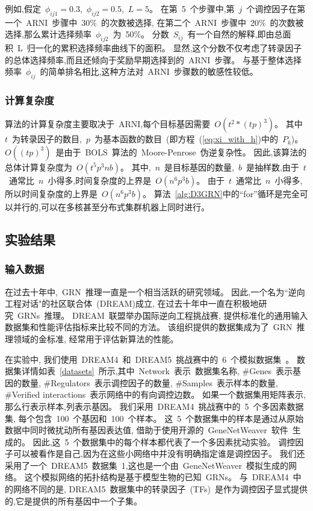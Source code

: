 例如,假定~$\phi_{ij1}=0.3$,~$\phi_{ij2}=0.5$,~$L=5$。
在第~5~个步骤中,第~$j$~个调控因子在第一个~ARNI~步骤中~30\%~的次数被选择,
在第二个~ARNI~步骤中~20\%~的次数被选择,那么累计选择频率~$\phi_{ij2}$~为~50\%。
分数~$S_{ij}$~有一个自然的解释,即由总面积~L~归一化的累积选择频率曲线下的面积。
显然,这个分数不仅考虑了转录因子的总体选择频率,而且还倾向于奖励早期选择到的~ARNI~步骤。
与基于整体选择频率~$\phi_{ij}$~的简单排名相比,这种方法对~ARNI~步骤数的敏感性较低。

\subsubsection{计算复杂度}

算法的计算复杂度主要取决于~ARNI,每个目标基因需要~$O(t^2*(tp)^3)$。
其中~$t$~为转录因子的数目,~$p$~为基本函数的数目~(即方程~(\ref{eq:xi_with_h})中的~$P_k$)。
$O((tp)^3)$~是由于~BOLS~算法的~Moore-Penrose~伪逆复杂性。
因此,该算法的总体计算复杂度为~$O(t^5p^3nb)$。
其中,~$n$~是目标基因的数量,~$b$~是抽样数,由于~$t$~通常比~$n$~小得多,时间复杂度的上界是~$O(n^6p^3b)$。
由于~$t$~通常比~$n$~小得多, 所以时间复杂度的上界是~$O(n^6p^3b)$。
算法~\ref{alg:D3GRN}中的``for''循环是完全可以并行的,可以在多核甚至分布式集群机器上同时进行。


\subsection{实验结果}
\subsubsection{输入数据}
在过去十年中,~GRN~推理一直是一个相当活跃的研究领域。
因此,一个名为``逆向工程对话"的社区联合体~(DREAM)\cite{stolovitzky2007dialogue}成立,
在过去十年中一直在积极地研究~GRNs~推理。
DREAM~联盟举办国际逆向工程挑战赛, 提供标准化的通用输入数据集和性能评估指标来比较不同的方法。
该组织提供的数据集成为了~GRN~推理领域的金标准, 经常用于评估新算法的性能。

在实验中,
我们使用~DREAM4~和~DREAM5~挑战赛中的~6~个模拟数据集~\cite{marbach2012wisdom}。
数据集详情如表~\ref{datasets}~所示,其中~Network~表示~数据集名称,
\#Genes~表示基因的数量, \#Regulators~表示调控因子的数量, \#Samples~表示样本的数量, 
\#Verified interactions~表示网络中的有向调控边数。
如果一个数据集用矩阵表示,那么行表示样本,列表示基因。
我们采用~DREAM4~挑战赛中的~5~个多因素数据集,
每个包含~100~个基因和~100~个样本。
这~5~个数据集中的样本是通过从原始数据中同时微扰动所有基因表达值, 借助于使用开源的~GeneNetWeaver~软件~\cite{marbach2009generating}生成的。
因此,这~5~个数据集中的每个样本都代表了一个多因素扰动实验。
调控因子可以被看作是自己,因为在这些小网络中并没有明确指定谁是调控因子。
我们还采用了一个~DREAM5~数据集~1,这也是一个由~GeneNetWeaver~模拟生成的网络。
这个模拟网络的拓扑结构是基于模型生物的已知~GRNs。
与~DREAM4~中的网络不同的是,
DREAM5~数据集中的转录因子~(TFs)~是作为调控因子显式提供的,它是提供的所有基因中一个子集。

